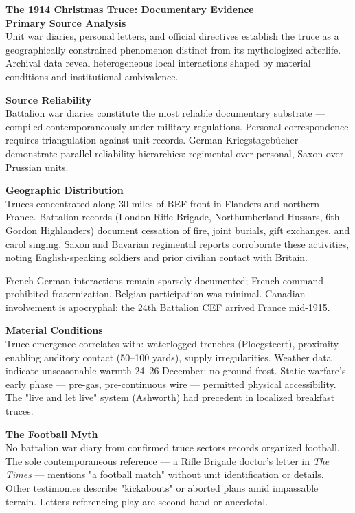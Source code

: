 \begin{technical}
{\Large\textbf{The 1914 Christmas Truce: Documentary Evidence}}\\[0.7em]

\noindent\textbf{Primary Source Analysis}\\[0.5em]
Unit war diaries, personal letters, and official directives establish the truce as a geographically constrained phenomenon distinct from its mythologized afterlife. Archival data reveal heterogeneous local interactions shaped by material conditions and institutional ambivalence.

\noindent\textbf{Source Reliability}\\[0.5em]
Battalion war diaries constitute the most reliable documentary substrate — compiled contemporaneously under military regulations. Personal correspondence requires triangulation against unit records. German Kriegstagebücher demonstrate parallel reliability hierarchies: regimental over personal, Saxon over Prussian units.

\noindent\textbf{Geographic Distribution}\\[0.5em]
Truces concentrated along 30 miles of BEF front in Flanders and northern France. Battalion records (London Rifle Brigade, Northumberland Hussars, 6th Gordon Highlanders) document cessation of fire, joint burials, gift exchanges, and carol singing. Saxon and Bavarian regimental reports corroborate these activities, noting English-speaking soldiers and prior civilian contact with Britain.

French-German interactions remain sparsely documented; French command prohibited fraternization. Belgian participation was minimal. Canadian involvement is apocryphal: the 24th Battalion CEF arrived France mid-1915.

\noindent\textbf{Material Conditions}\\[0.5em]
Truce emergence correlates with: waterlogged trenches (Ploegsteert), proximity enabling auditory contact (50–100 yards), supply irregularities. Weather data indicate unseasonable warmth 24–26 December: no ground frost. Static warfare's early phase — pre-gas, pre-continuous wire — permitted physical accessibility. The "live and let live" system (Ashworth) had precedent in localized breakfast truces.

\noindent\textbf{The Football Myth}\\[0.5em]
No battalion war diary from confirmed truce sectors records organized football. The sole contemporaneous reference — a Rifle Brigade doctor's letter in \textit{The Times} — mentions "a football match" without unit identification or details. Other testimonies describe "kickabouts" or aborted plans amid impassable terrain. Letters referencing play are second-hand or anecdotal.


\end{technical}
